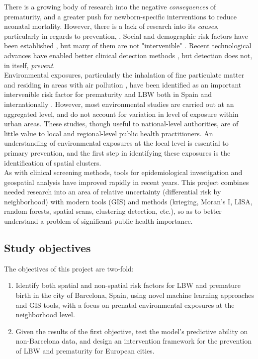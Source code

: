 \documentclass{article}
\begin{document}
\begin{multicols}{2}
\noindent There is a growing body of research into the negative \emph{consequences} of prematurity, and a greater push for newborn-specific interventions to reduce neonatal mortality. \cite{Eichenwald2008, Wardlaw2014} However, there is a lack of research into its \emph{causes}, particularly in regards to prevention, \cite{GrisaruGranovsky2014,Rubens2014}.  Social and demographic risk factors have been established \cite{Slopen2015, Yego2014}, but many of them are not "intervenible" \cite{Schempf2007, Shah2010, Kozuki2013}. Recent technological advances have enabled better clinical detection methods \cite{Hatanaka2014, Wapner2014}, but detection does not, in itself, \emph{prevent}. \\

\noindent Environmental exposures, particularly the inhalation of fine particulate matter and residing in areas with air pollution , have been identified as an important intervenible risk factor for prematurity and LBW both in Spain \cite{2014} and internationally \cite{Yorifuji2015, Morales2014, deMelo2014}. However, most environmental studies are carried out at an aggregated level, and do not account for variation in level of exposure within urban areas. These studies, though useful to national-level authorities, are of little value to local and regional-level public health practitioners.  An understanding of environmental exposures at the local level is essential to primary prevention, and the first step in identifying these exposures is the identification of spatial clusters.  \\

\noindent As with clinical screening methods, tools for epidemiological investigation and geospatial analysis have improved rapidly in recent years.  This project combines needed research into an area of relative uncertainty (differential risk by neighborhood) with modern tools (GIS) and methods (krieging, Moran's I, LISA, random forests, spatial scans, clustering detection, etc.), so as to better understand a problem of significant public health importance.


\subsection*{Study objectives}
The objectives of this project are two-fold: 
\begin{enumerate}
\item Identify both spatial and non-spatial risk factors for LBW and premature birth in the city of Barcelona, Spain, using novel machine learning approaches and GIS tools, with a focus on prenatal environmental exposures at the neighborhood level.
\item Given the results of the first objective, test the model's predictive ability on non-Barcelona data, and design an intervention framework for the prevention of LBW and prematurity for European cities. 
\end{enumerate}



\end{multicols}
\end{document}
